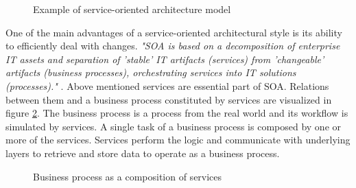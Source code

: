 \begin{figure}[htp] 
\caption{Example of service-oriented architecture model}
\label{fig:soa-architecture}
\end{figure}  

One of the main advantages of a service-oriented architectural style is its ability to efficiently deal with changes. \textit{"SOA is based on a decomposition of enterprise IT assets and separation of 'stable' IT artifacts (services) from 'changeable' artifacts (business processes), orchestrating services into IT solutions (processes)."} \cite{website:versioning-in-soa}.
Above mentioned services are essential part of SOA. Relations between them and a business process constituted by services are visualized in figure \ref{fig:business-process-services}. The business process is a process from the real world and its workflow is simulated by services. A single task of a business process is composed by one or more of the services. Services perform the logic and communicate with underlying layers to retrieve and store data to operate as a business process.

\begin{figure}[htp] 
\caption{Business process as a composition of services}
\label{fig:business-process-services}
\end{figure} 

